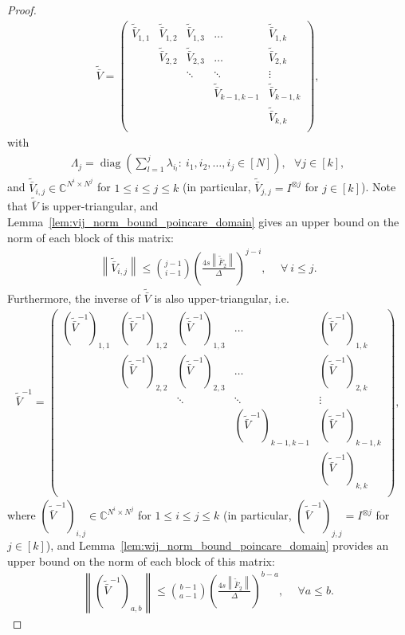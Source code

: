 \documentclass[superscriptaddress,onecolumn,nofootinbib,longbibliography,a4paper,accepted=2026-09-29]{quantumarticle}
\theoremstyle{plain}
\theoremstyle{definition}
\numberwithin{thm}{section}
\numberwithin{assumption}{section}
\numberwithin{lemma}{section}
\numberwithin{prop}{section}
\numberwithin{cor}{section}
\numberwithin{definition}{section}
\numberwithin{rmk}{section}
\numberwithin{equation}{section}
\newcommand{\norm}[1]     {\left\| #1 \right\|}
\newcommand{\myC}{\mathbb{C}}
\newcommand{\lrb}[1]{\left ( #1 \right )}
\newcommand{\diag}[1]{\operatorname{diag}\lrb{#1}}
\begin{document}
\begin{proof}
\begin{align}
        \tilde{\bar{V}}=\begin{pmatrix}
        \tilde{\bar{V}}_{1,1}  & \tilde{\bar{V}}_{1,2}   &  \tilde{\bar{V}}_{1,3} & \dots  & \tilde{\bar{V}}_{1,k} \\
                 & \tilde{\bar{V}}_{2,2}   &  \tilde{\bar{V}}_{2,3} & \dots & \tilde{\bar{V}}_{2,k} \\
                 &           & \ddots &   \ddots       & \vdots \\
                 &           &          & \tilde{\bar{V}}_{k-1,k-1} & \tilde{\bar{V}}_{k-1, k} \\
                &           &          &  & \tilde{\bar{V}}_{k, k} \\\end{pmatrix},     
\end{align}
with
\begin{align}
\Lambda_j=\diag{\sum_{l=1}^j \lambda_{i_l}:~i_1, i_2,\dots,i_j\in [N]}, ~~~\forall j \in [k],    
\end{align}
and $\tilde{\bar{V}}_{i,j} \in \myC^{N^i \times N^j}$ for $1 \le i \le j \le k$ (in particular, 
$\tilde{\bar{V}}_{j,j}=I^{\otimes j}$ for $j \in [k]$). Note that $\tilde{\bar{V}}$ is upper-triangular, and Lemma~\ref{lem:vij_norm_bound_poincare_domain} gives an upper bound on the norm of each block of this matrix:
\begin{align}
    \norm{\tilde{\bar{V}}_{i,j}} 
    \le \binom{j-1}{i-1} \lrb{\frac{4s\norm{\tilde{\bar{F}}_2}}{\Delta}}^{j-i},~&~\forall~i \le j.
    \label{eq:bound_on_vij_norm}
\end{align}
Furthermore, the inverse of $\tilde{\bar{V}}$ is also upper-triangular, i.e.
\begin{align}
 \tilde{\bar{V}}^{-1}=\begin{pmatrix}
        (\tilde{\bar{V}}^{-1})_{1,1}  & (\tilde{\bar{V}}^{-1})_{1,2}   &  (\tilde{\bar{V}}^{-1})_{1,3} & \dots  & (\tilde{\bar{V}}^{-1})_{1,k} \\
                 & (\tilde{\bar{V}}^{-1})_{2,2}   &  (\tilde{\bar{V}}^{-1})_{2,3} & \dots & (\tilde{\bar{V}}^{-1})_{2,k} \\
                 &           & \ddots &   \ddots       & \vdots \\
                 &           &          & (\tilde{\bar{V}}^{-1})_{k-1,k-1} & (\tilde{\bar{V}}^{-1})_{k-1, k} \\
                &           &          &  & (\tilde{\bar{V}}^{-1})_{k, k} \\\end{pmatrix},   
\end{align}
where $(\tilde{\bar{V}}^{-1})_{i,j} \in \myC^{N^i \times N^j}$ for $1 \le i \le j \le k$ 
(in particular, $(\tilde{\bar{V}}^{-1})_{j,j}=I^{\otimes j}$ for $j \in [k]$),  and Lemma~\ref{lem:wij_norm_bound_poincare_domain} provides an upper bound on the norm of each block of this matrix:
\begin{align}
\norm{\lrb{\tilde{\bar{V}}^{-1}}_{a,b}} \le \binom{b-1}{a-1}\lrb{\frac{4s\norm{\tilde{\bar{F}}_2}}{\Delta}}^{b-a},~&~\forall a\le b.
\label{eq:bound_on_wab_norm}
\end{align}


\end{proof}
\end{document}
